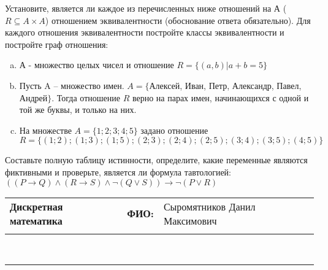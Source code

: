 \documentclass[10pt]{exam}
\newcommand{\class}{Дискретная математика}
\newcommand{\examdate}{}
\begin{document}
\begin{questions}
\question
Установите, является ли каждое из перечисленных ниже отношений на А ($R \subseteq A \times A$) отношением эквивалентности (обоснование ответа обязательно). Для каждого отношения эквивалентности постройте классы 
эквивалентности и постройте граф отношения:
\begin{enumerate} [a)]\setcounter{enumi}{0}
\item А - множество целых чисел и отношение $R = \{(a,b)|a + b = 5\}$
\item Пусть A – множество имен. $A = \{ $Алексей, Иван, Петр, Александр, Павел, Андрей$ \}$. Тогда отношение $R $ верно на парах имен, начинающихся с одной и той же буквы, и только на них.
\item На множестве $A = \{1; 2; 3; 4; 5\}$ задано отношение $R = \{(1; 2); (1; 3); (1; 5); (2; 3); (2; 4); (2; 5); (3; 4); (3; 5); (4; 5)\}$
\end{enumerate}\question Составьте полную таблицу истинности, определите, какие переменные являются фиктивными и проверьте, является ли формула тавтологией:
$((P \rightarrow Q) \land (R \rightarrow S) \land \neg (Q \lor S)) \rightarrow \neg (P \lor R)$

\end{questions}
\newpage
\begin{flushright}
\begin{tabular}{p{2.8in} r l}
\textbf{\class} & \textbf{ФИО:} &Сыромятников Данил Максимович
\\

\textbf{\examdate} &&\\
\end{tabular}\\
\end{flushright}
\rule[1ex]{\textwidth}{.1pt}
\end{document}
